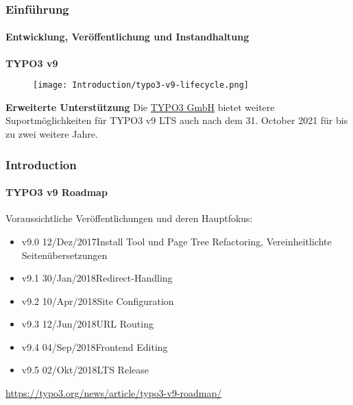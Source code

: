 \begin{frame}[fragile]
	\frametitle{Einführung}
	\framesubtitle{Entwicklung, Veröffentlichung und Instandhaltung}

	\textbf{TYPO3 v9}

	\begin{figure}
		\texttt{[image: Introduction/typo3-v9-lifecycle.png]}
	\end{figure}

	\textbf{Erweiterte Unterstützung}\newline
	\smaller
		Die \href{https://typo3.com}{TYPO3 GmbH} bietet weitere Suportmöglichkeiten
		für TYPO3 v9 LTS auch nach dem 31. October 2021 für bis zu zwei weitere Jahre.
	\normalsize


\end{frame}

\begin{frame}[fragile]
	\frametitle{Introduction}
	\framesubtitle{TYPO3 v9 Roadmap}

	Voraussichtliche Veröffentlichungen und deren Hauptfokus:

	\begin{itemize}

		\item v9.0 \tabto{1.1cm}12/Dez/2017\tabto{3.4cm}Install Tool und Page Tree Refactoring,\newline
			\tabto{3.4cm}Vereinheitlichte Seitenübersetzungen
		\item
			\begingroup
				\color{typo3orange}
					v9.1 \tabto{1.1cm}30/Jan/2018\tabto{3.4cm}Redirect-Handling
			\endgroup
		\item v9.2 \tabto{1.1cm}10/Apr/2018\tabto{3.4cm}Site Configuration
		\item v9.3 \tabto{1.1cm}12/Jun/2018\tabto{3.4cm}URL Routing
		\item v9.4 \tabto{1.1cm}04/Sep/2018\tabto{3.4cm}Frontend Editing
		\item v9.5 \tabto{1.1cm}02/Okt/2018\tabto{3.4cm}LTS Release

	\end{itemize}

	\smaller
		\url{https://typo3.org/news/article/typo3-v9-roadmap/}
	\normalsize

\end{frame}

